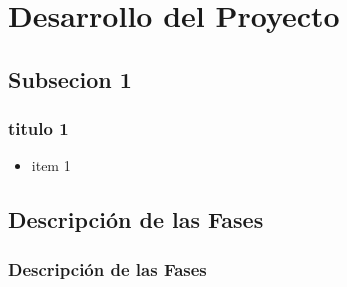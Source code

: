 \section{Desarrollo del Proyecto}
\subsection{Subsecion 1}
\begin{frame}
   \frametitle{titulo 1}

   \begin{itemize}
   \item item 1
   \end{itemize}
\end{frame}
\subsection{Descripción de las Fases}
\begin{frame}
    \frametitle{Descripción de las Fases}
\end{frame}